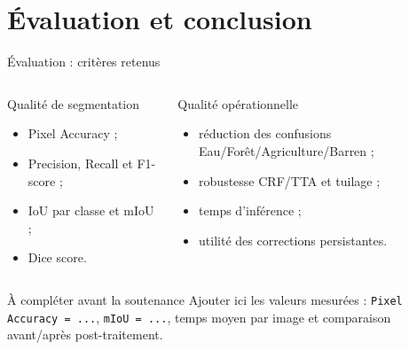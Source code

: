 \documentclass[10pt,aspectratio=169]{beamer}
\begin{document}
\section{Évaluation et conclusion}

\begin{frame}{Évaluation : critères retenus}
  \begin{columns}[T]
      \begin{block}{Qualité de segmentation}
        \begin{itemize}
          \item Pixel Accuracy ;
          \item Precision, Recall et F1-score ;
          \item IoU par classe et mIoU ;
          \item Dice score.
        \end{itemize}
      \end{block}
      \begin{block}{Qualité opérationnelle}
        \begin{itemize}
          \item réduction des confusions Eau/Forêt/Agriculture/Barren ;
          \item robustesse CRF/TTA et tuilage ;
          \item temps d'inférence ;
          \item utilité des corrections persistantes.
        \end{itemize}
      \end{block}
  \end{columns}
  \vspace{0.25cm}
  \begin{alertblock}{À compléter avant la soutenance}
    Ajouter ici les valeurs mesurées : \texttt{Pixel Accuracy = ...}, \texttt{mIoU = ...}, temps moyen par image et comparaison avant/après post-traitement.
  \end{alertblock}
\end{frame}
\end{document}
